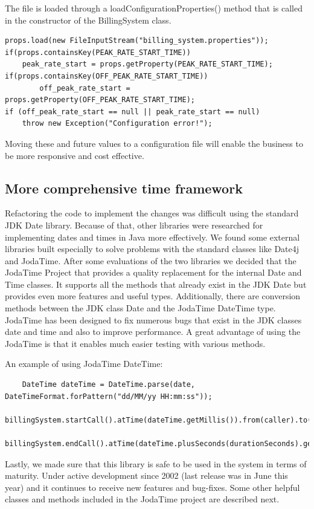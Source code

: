 \documentclass[pdftex,11pt,a4paper]{article}
\begin{document}
The file is loaded through a loadConfigurationProperties() method that is called in the constructor of the BillingSystem class. 

\begin{lstlisting}
props.load(new FileInputStream("billing_system.properties"));
if(props.containsKey(PEAK_RATE_START_TIME))
	peak_rate_start = props.getProperty(PEAK_RATE_START_TIME);
if(props.containsKey(OFF_PEAK_RATE_START_TIME))
     	off_peak_rate_start = props.getProperty(OFF_PEAK_RATE_START_TIME);
if (off_peak_rate_start == null || peak_rate_start == null)
	throw new Exception("Configuration error!");	
\end{lstlisting}

Moving these and future values to a configuration file will enable the business to be more responsive and cost effective.

\subsection{More comprehensive time framework}
Refactoring the code to implement the changes was difficult using the standard JDK Date library. Because of that, other libraries were researched for implementing dates and times in Java more effectively. We found some external libraries built especially to solve problems with the standard classes like Date4j and JodaTime. After some evaluations of the two libraries we decided that the JodaTime Project that provides a quality replacement for the internal Date and Time classes. It supports all the methods that already exist in the JDK Date but provides even more features and useful types. Additionally, there are conversion methods between the JDK class Date and the JodaTime DateTime type. JodaTime has been designed to fix numerous bugs that exist in the JDK classes date and time and also to improve performance. A great advantage of using the JodaTime is that it enables much easier testing with various methods. 

An example of using JodaTime DateTime:
\begin{lstlisting}
	DateTime dateTime = DateTime.parse(date, DateTimeFormat.forPattern("dd/MM/yy HH:mm:ss"));
	billingSystem.startCall().atTime(dateTime.getMillis()).from(caller).to(callee);
	billingSystem.endCall().atTime(dateTime.plusSeconds(durationSeconds).getMillis()).from(caller).to(callee);
\end{lstlisting}

Lastly, we made sure that this library is safe to be used in the system in terms of maturity. Under active development since 2002 (last release was in June this year) and it continues to receive new features and bug-fixes. Some other helpful classes and methods included in the JodaTime project are described next.
\end{document}
